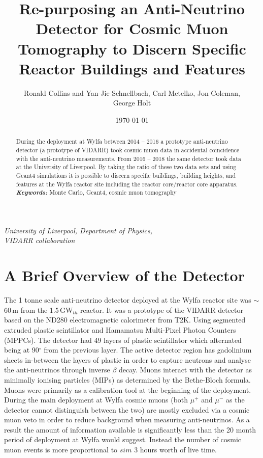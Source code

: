 \documentclass[12pt,a4paper]{article}
\title{Re-purposing an Anti-Neutrino Detector for Cosmic Muon Tomography to Discern Specific Reactor Buildings and Features}
\date{\today}
\author{Ronald Collins and Yan-Jie Schnellbach, Carl Metelko, Jon Coleman, \\George Holt}
\begin{document}
\maketitle


\begin{center}
\textit{University of Liverpool, Department of Physics,\\}
\textit{VIDARR collaboration\\}
\end{center}
 

\begin{abstract}
\normalsize During the deployment at Wylfa between 2014 -- 2016 a prototype anti-neutrino detector (a prototype of VIDARR) took cosmic muon data in accidental coincidence with the anti-neutrino measurements. From 2016 -- 2018 the same detector took data at the University of Liverpool. By taking the ratio of these two data sets and using Geant4 simulations it is possible to discern specific buildings, building heights, and features at the Wylfa reactor site including the reactor core/reactor core apparatus.\\

\providecommand{\keywords}[1]{\textbf{\textit{Keywords:}} #1} %
\keywords{Monte Carlo, Geant4, cosmic muon tomography}
\end{abstract}
\vspace{5mm} %



\section{A Brief Overview of the Detector}
The 1 tonne scale anti-neutrino detector deployed at the Wylfa reactor site was $\sim$ 60\,m from the 1.5\,GW$_{th}$ reactor. It was a prototype of the VIDARR detector based on the ND280 electromagnetic calorimeter from T2K. Using segmented extruded plastic scintillator and Hamamatsu Multi-Pixel Photon Counters (MPPCs). The detector had 49 layers of plastic scintillator which alternated being at 90$^\circ$ from the previous layer. The active detector region has gadolinium sheets in-between the layers of plastic in order to capture neutrons and analyse the anti-neutrinos through inverse $\beta$ decay. Muons interact with the detector as minimally ionising particles (MIPs) as determined by the Bethe-Bloch formula. Muons were primarily as a calibration tool at the beginning of the deployment\cite{Carroll_2018}. During the main deployment at Wylfa cosmic muons (both $\mu^+$ and $\mu^-$ as the detector cannot distinguish between the two) are mostly excluded via a cosmic muon veto in order to reduce background when measuring anti-neutrinos. As a result the amount of information available is significantly less than the 20 month period of deployment at Wylfa would suggest. Instead the number of cosmic muon events is more proportional to $sim$ 3 hours worth of live time. 
 
\end{document}
